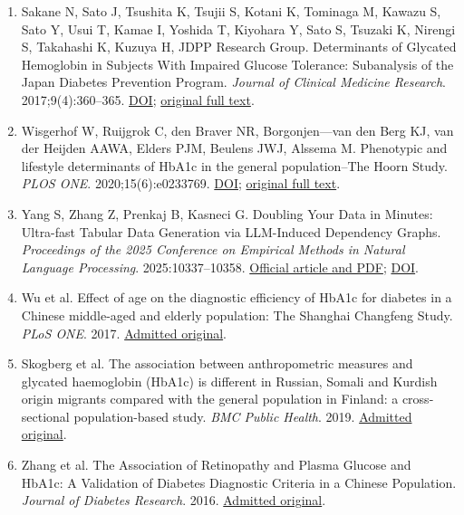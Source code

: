 \documentclass[10pt,twocolumn]{article}
\begin{document}
\begin{enumerate}
\item Sakane N, Sato J, Tsushita K, Tsujii S, Kotani K, Tominaga M, Kawazu S, Sato Y, Usui T, Kamae I, Yoshida T, Kiyohara Y, Sato S, Tsuzaki K, Nirengi S, Takahashi K, Kuzuya H, JDPP Research Group. Determinants of Glycated Hemoglobin in Subjects With Impaired Glucose Tolerance: Subanalysis of the Japan Diabetes Prevention Program. \emph{Journal of Clinical Medicine Research}. 2017;9(4):360–365. \href{https://doi.org/10.14740/jocmr2928w}{DOI}; \href{https://pmc.ncbi.nlm.nih.gov/articles/PMC5330780/}{original full text}.

\item Wisgerhof W, Ruijgrok C, den Braver NR, Borgonjen—van den Berg KJ, van der Heijden AAWA, Elders PJM, Beulens JWJ, Alssema M. Phenotypic and lifestyle determinants of HbA1c in the general population–The Hoorn Study. \emph{PLOS ONE}. 2020;15(6):e0233769. \href{https://doi.org/10.1371/journal.pone.0233769}{DOI}; \href{https://pmc.ncbi.nlm.nih.gov/articles/PMC7272077/}{original full text}.

\item Yang S, Zhang Z, Prenkaj B, Kasneci G. Doubling Your Data in Minutes: Ultra-fast Tabular Data Generation via LLM-Induced Dependency Graphs. \emph{Proceedings of the 2025 Conference on Empirical Methods in Natural Language Processing}. 2025:10337–10358. \href{https://aclanthology.org/2025.emnlp-main.525/}{Official article and PDF}; \href{https://doi.org/10.18653/v1/2025.emnlp-main.525}{DOI}.

\item Wu et al. Effect of age on the diagnostic efficiency of HbA1c for diabetes in a Chinese middle-aged and elderly population: The Shanghai Changfeng Study. \emph{PLoS ONE}. 2017. \href{https://pmc.ncbi.nlm.nih.gov/articles/PMC5591004/}{Admitted original}.

\item Skogberg et al. The association between anthropometric measures and glycated haemoglobin (HbA1c) is different in Russian, Somali and Kurdish origin migrants compared with the general population in Finland: a cross-sectional population-based study. \emph{BMC Public Health}. 2019. \href{https://pmc.ncbi.nlm.nih.gov/articles/PMC6458679/}{Admitted original}.

\item Zhang et al. The Association of Retinopathy and Plasma Glucose and HbA1c: A Validation of Diabetes Diagnostic Criteria in a Chinese Population. \emph{Journal of Diabetes Research}. 2016. \href{https://pmc.ncbi.nlm.nih.gov/articles/PMC5078665/}{Admitted original}.


\end{enumerate}
\end{document}
